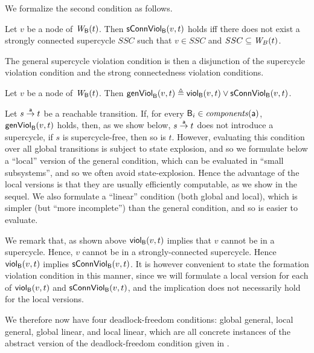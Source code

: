 We formalize the second condition as follows.

\begin{definition}
\label{def:sConn.violation}
 Let $v$ be a node of $\wfg{\B}{t}$.   Then $\connViol{v}{t}$ holds iff there does not exist a 
strongly connected
 supercycle $SSC$ such that $v \in SSC$ and $SSC \sub \wfg{B}{t}$.
\end{definition}






The general supercycle violation condition is then a disjunction of the supercycle violation condition
and the strong connectedness violation conditions.


\begin{definition}
\label{def:formation.violation} 
\label{defn:formation.violation} 
Let $v$ be a node of $\wfg{\B}{t}$.
Then 
$\genViol{v}{t}  \df \scV{v}{t}  \lor \connViol{v}{t}$.
\end{definition}
%
Let $s \goesto[\act] t$ be a reachable transition. If, for every $\B_i \in \cmps{\act}$,
$\formViol{v}{t}$ holds, then, as we show below, $s \goesto[\act] t$ does not introduce a
supercycle, \ie if $s$ is supercycle-free, then so is $t$.  However, evaluating this condition over
all global transitions is subject to state explosion, and so we formulate below a ``local'' version
of the general condition, which can be evaluated in ``small subsystems'', and so we often avoid
state-explosion. Hence the advantage of the local versions is that they are usually efficiently
computable, as we show in the sequel.  We also formulate a ``linear'' condition (both global and
local), which is simpler (but ``more incomplete'') than the general condition, and so is easier to
evaluate.

We remark that, as shown above $\scV{v}{t}$ implies that $v$ cannot be in a
supercycle. Hence, $v$ cannot be in a strongly-connected supercycle.  Hence
$\scV{v}{t}$ implies $\connViol{v}{t}$. It is however convenient to state the
formation violation condition in this manner, since we will formulate a local version
for each of $\scV{v}{t}$ and $\connViol{v}{t}$, and the implication does not
necessarily hold for the local versions. 

We therefore now have four deadlock-freedom conditions: global general, local general, 
global linear, and local linear, which are all concrete instances of
the abstract version of 
the deadlock-freedom condition given in .


